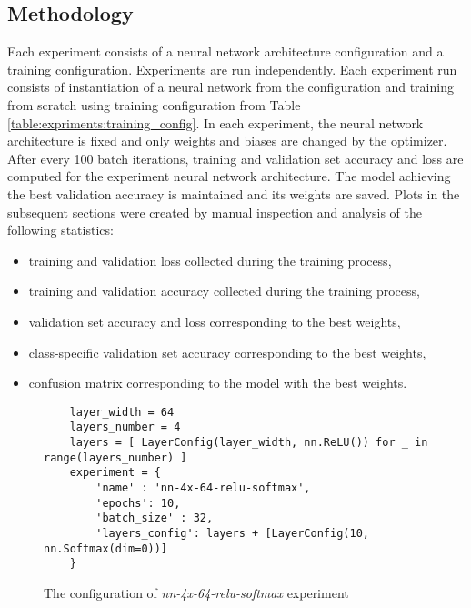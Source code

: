 \subsection{Methodology}
\label{section:experiments:classification:experiments-methodology}

Each experiment consists of a neural network architecture configuration and a training configuration. Experiments are run independently. 
Each experiment run consists of instantiation of a neural network from the configuration and training from scratch using training configuration from Table \ref{table:expriments:training_config}. In each experiment, the neural network architecture is fixed and only weights and biases are changed by the optimizer. After every 100 batch iterations, training and validation set accuracy and loss are computed for the experiment neural network architecture. The model achieving the best validation accuracy is maintained and its weights are saved. Plots in the subsequent sections were created by manual inspection and analysis of the following statistics:
\begin{itemize}[noitemsep]
    \item training and validation loss collected during the training process,
    \item training and validation accuracy collected during the training process,
    \item validation set accuracy and loss corresponding to the best weights,
    \item class-specific validation set accuracy corresponding to the best weights,
    \item confusion matrix corresponding to the model with the best weights.
\end{itemize}
\begin{figure}[H]
    \centering
    \begin{verbatim}
    layer_width = 64
    layers_number = 4
    layers = [ LayerConfig(layer_width, nn.ReLU()) for _ in range(layers_number) ]
    experiment = {
        'name' : 'nn-4x-64-relu-softmax',
        'epochs': 10,
        'batch_size' : 32,
        'layers_config': layers + [LayerConfig(10, nn.Softmax(dim=0))]
    }
    \end{verbatim}
    \caption{The configuration of \textit{nn-4x-64-relu-softmax} experiment}
    \label{fig:experiments:classification:experiment-example}
\end{figure}